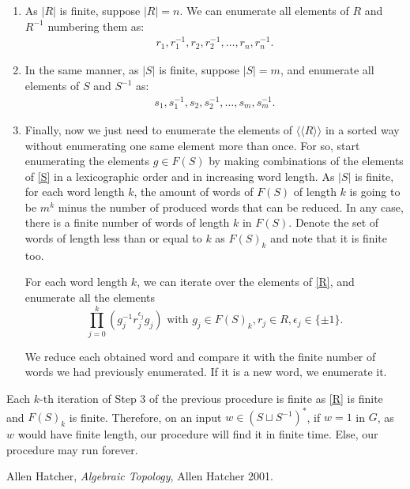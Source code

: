 \documentclass[11pt,a4paper]{article}
\begin{document}
\begin{enumerate}
  \item As $ |R| $ is finite, suppose $ |R| = n $. We can enumerate all elements of $ R $ and $ R^{-1} $ numbering them as:
  \begin{align} \label{R}
    r_1, r_1^{-1}, r_2, r_2^{-1}, \dots, r_n, r_n^{-1}.
  \end{align}
  
  \item In the same manner, as $ |S| $ is finite, suppose $ |S| = m $, and enumerate all elements of $ S $ and $ S^{-1} $ as:
  \begin{align} \label{S}
    s_1, s_1^{-1}, s_2, s_2^{-1}, \dots, s_m, s_m^{-1}.
  \end{align}

  \item Finally, now we just need to enumerate the elements of $ \langle \langle R \rangle \rangle $ in a sorted way without enumerating one same element more than once. For so, start enumerating the elements $ g \in F(S) $ by making combinations of the elements of \eqref{S} in a lexicographic order and in increasing word length. As $|S|$ is finite, for each word length $ k $, the amount of words of $ F(S) $ of length $ k $ is going to be $ m ^k $ minus the number of produced words that can be reduced. In any case, there is a finite number of words of length $ k $ in $ F(S) $. Denote the set of words of length less than or equal to $ k $ as  $ F(S)_k $ and note that it is finite too.
  
  For each word length $ k $, we can iterate over the elements of \eqref{R}, and enumerate all the elements
  $$
  \prod_{j=0}^k (g_j^{-1} r_j^{\epsilon_j} g_j) \text{ with } g_j \in F(S)_k, r_j \in R, \epsilon_j \in \{ \pm 1 \}.
  $$

  We reduce each obtained word and compare it with the finite number of words we had previously enumerated. If it is a new word, we enumerate it. 
\end{enumerate}

Each $k$-th iteration of Step 3 of the previous procedure is finite as \eqref{R} is finite and $ F(S)_k $ is finite. Therefore, on an input $ w \in (S \sqcup S^{-1})^* $, if $ w = 1 $ in $ G $, as $ w $ would have finite length, our procedure will find it in finite time. Else, our procedure may run forever.

\begin{thebibliography}{9}

  Allen Hatcher,
  \textit{Algebraic Topology},
  Allen Hatcher 2001.
  
\end{thebibliography}
\end{document}
